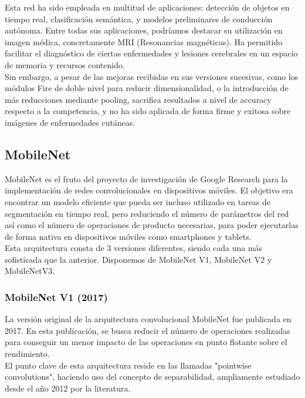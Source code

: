 Esta red ha sido empleada en multitud de aplicaciones: detección de objetos en tiempo real, clasificación semántica, y modelos preliminares de conducción autónoma. Entre todas sus aplicaciones, podríamos destacar su utilización en imagen médica, concretamente MRI (Resonancias magnéticas). Ha permitido facilitar el diagnóstico de ciertas enfermedades y lesiones cerebrales en un espacio de memoria y recursos contenido.\\

Sin embargo, a pesar de las mejoras recibidas en sus versiones sucesivas, como los módulos Fire de doble nivel para reducir dimensionalidad, o la introducción de más reducciones mediante pooling, sacrifica resultados a nivel de accuracy respecto a la competencia, y no ha sido aplicada de forma firme y exitosa sobre imágenes de enfermedades cutáneas.



\subsection{MobileNet}
\label{cap:mobile}

MobileNet es el fruto del proyecto de investigación de Google Research para la implementación de redes convolucionales en dispositivos móviles. El objetivo era encontrar un modelo eficiente que pueda ser incluso utilizado en tareas de segmentación en tiempo real, pero reduciendo el número de parámetros del red así como el número de operaciones de producto necesarias, para poder ejecutarlas de forma nativa en dispositivos móviles como smartphones y tablets.\\

Esta arquitectura consta de 3 versiones diferentes, siendo cada una más sofisticada que la anterior. Disponemos de MobileNet V1, MobileNet V2 y MobileNetV3.

\subsubsection{MobileNet V1 (2017)}

La versión original de la arquitectura convolucional MobileNet  \cite{howard2017mobilenets} fue publicada en 2017. En esta publicación, se busca reducir el número de operaciones realizadas para conseguir un menor impacto de las operaciones en punto flotante sobre el rendimiento.\\
El punto clave de esta arquitectura reside en las llamadas "pointwise convolutions", haciendo uso del concepto de separabilidad, ampliamente estudiado desde el año 2012 por la literatura.

